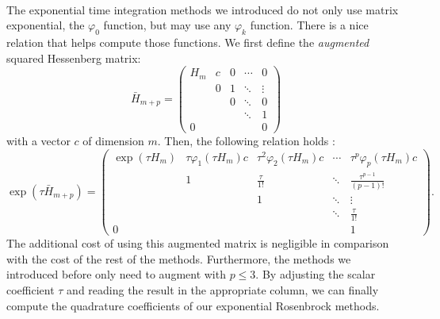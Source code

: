       \paragraph{}
      The exponential time integration methods we introduced do not only use matrix exponential, the $\varphi_0$ function, but may use any $\varphi_k$ function.
      There is a nice relation that helps compute those functions.
      We first define the \emph{augmented} squared Hessenberg matrix:
      \begin{equation}
        \bar{H}_{m + p} = \begin{pmatrix}
          H_m & c & 0 & \cdots & 0      \\
              & 0 & 1 & \ddots & \vdots \\
              &   & 0 & \ddots & 0      \\
              &   &   & \ddots & 1      \\
          0   &   &   &        & 0
        \end{pmatrix}
      \end{equation}
      with a vector $c$ of dimension $m$.
      Then, the following relation holds \cite{Sidje1998}:
      \begingroup
      \renewcommand*{\arraystretch}{1.5}
      \begin{equation}
        \exp\left(\tau \bar{H}_{m + p}\right) = \begin{pmatrix}
          \exp\left(\tau H_m\right) & \tau \varphi_1\left(\tau H_m\right) c & \tau^2 \varphi_2\left(\tau H_m\right) c & \cdots & \tau^p \varphi_p\left(\tau H_m\right) c \\
                                    & 1                                     & \frac{\tau}{1!}                         & \ddots & \frac{\tau^{p-1}}{\left(p - 1\right)!}  \\
                                    &                                       & 1                                       & \ddots & \vdots                                  \\
                                    &                                       &                                         & \ddots & \frac{\tau}{1!}                         \\
          0                         &                                       &                                         &        & 1
        \end{pmatrix} .
      \end{equation}
      \endgroup
      The additional cost of using this augmented matrix is negligible in comparison with the cost of the rest of the methods.
      Furthermore, the methods we introduced before only need to augment with $p \leq 3$.
      By adjusting the scalar coefficient $\tau$ and reading the result in the appropriate column, we can finally compute the quadrature coefficients of our exponential Rosenbrock methods.


